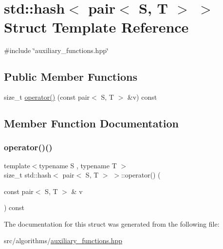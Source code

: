 \hypertarget{structstd_1_1hash_3_01pair_3_01S_00_01T_01_4_01_4}{}\section{std\+:\+:hash$<$ pair$<$ S, T $>$ $>$ Struct Template Reference}
\label{structstd_1_1hash_3_01pair_3_01S_00_01T_01_4_01_4}


{\ttfamily \#include \char`\"{}auxiliary\+\_\+functions.\+hpp\char`\"{}}

\subsection*{Public Member Functions}
\begin{DoxyCompactItemize}
\item 
size\+\_\+t \mbox{\hyperlink{structstd_1_1hash_3_01pair_3_01S_00_01T_01_4_01_4_a6fec6cb26e96fb20d4ec121487e5acb4}{operator()}} (const pair$<$ S, T $>$ \&v) const
\end{DoxyCompactItemize}


\subsection{Member Function Documentation}
\mbox{\label{structstd_1_1hash_3_01pair_3_01S_00_01T_01_4_01_4_a6fec6cb26e96fb20d4ec121487e5acb4}} 
\subsubsection{\texorpdfstring{operator()()}{operator()()}}
{\footnotesize\ttfamily template$<$typename S , typename T $>$ \\
size\+\_\+t std\+::hash$<$ pair$<$ S, T $>$ $>$\+::operator() (\begin{DoxyParamCaption}\item[{const pair$<$ S, T $>$ \&}]{v }\end{DoxyParamCaption}) const\hspace{0.3cm}{\ttfamily [inline]}}



The documentation for this struct was generated from the following file\+:\begin{DoxyCompactItemize}
\item 
src/algorithms/\mbox{\hyperlink{auxiliary__functions_8hpp}{auxiliary\+\_\+functions.\+hpp}}\end{DoxyCompactItemize}
